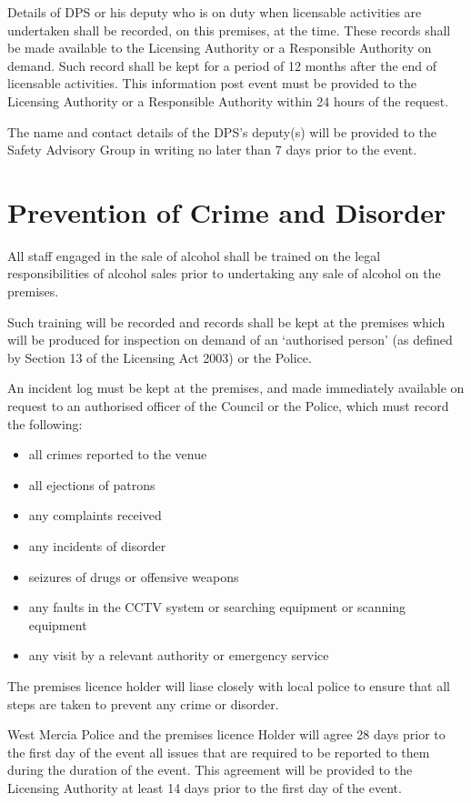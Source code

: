 Details of DPS or his deputy who
is on duty when licensable activities are undertaken shall be recorded,
on this premises, at the time. These records shall be made available to the
Licensing Authority or a Responsible Authority on demand. Such record
shall be kept for a period of 12 months after the end of licensable
activities. This information post event must be provided to the
Licensing Authority or a Responsible Authority within 24 hours of the
request.

The name and contact details of the DPS's deputy(s)
will be provided to the Safety Advisory Group in writing no later than 7
days prior to the event.

\section{Prevention of Crime and Disorder}

All staff engaged in the sale of alcohol shall be trained on the legal
responsibilities of alcohol sales prior to undertaking any sale of alcohol
on the premises.

Such training will be recorded and records shall be kept at the premises
which will be produced for inspection on demand of an `authorised
person' (as defined by Section 13 of the Licensing Act 2003) or the
Police.

An incident log must be kept at the premises, and made immediately
available on request to an authorised officer of the Council or the
Police, which must record the following:

\begin{itemize}
\tightlist
\item
  all crimes reported to the venue
\item
  all ejections of patrons
\item
  any complaints received
\item
  any incidents of disorder
\item
  seizures of drugs or offensive weapons
\item
  any faults in the CCTV system or searching equipment or scanning
  equipment
\item
  any visit by a relevant authority or emergency service
\end{itemize}

The premises licence holder will liase closely with local police to
ensure that all steps are taken to prevent any crime or disorder.

West Mercia Police and the premises licence Holder will agree 28 days
prior to the first day of the event all issues that are required to be
reported to them during the duration of the event. This agreement will
be provided to the Licensing Authority at least 14 days prior to the
first day of the event.


